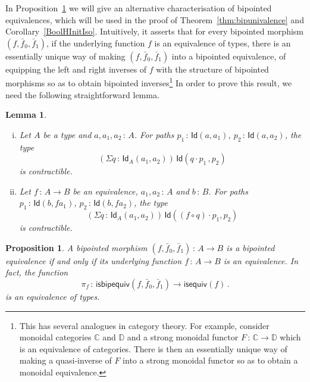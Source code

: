 \documentclass[10pt,a4paper,oneside,reqno]{amsart}
\numberwithin{equation}{section}
\theoremstyle{mythm}
\newtheorem{lemma}[theorem]{Lemma}
\newtheorem{proposition}[theorem]{Proposition}
\theoremstyle{mydef}
\theoremstyle{myrmk}
\newcommand{\ie}{\text{i.e.\ }}
\newcommand{\co}{\,{:}\,}
\newcommand{\ct}{\cdot}
\newcommand{\isequiv}{\mathsf{isequiv}}
\newcommand{\Id}{\mathsf{Id}}
\newcommand{\isbipequiv}{\mathsf{isbipequiv}}
\begin{document}
In Proposition~\ref{thm:usemere} we will give an alternative characterisation of bipointed 
equivalences, which will be used in the proof of Theorem~\ref{thm:bipunivalence} and Corollary~\ref{BoolHInitIso}.
Intuitively, it asserts that for every bipointed morphism $(f, \bar{f}_0, \bar{f}_1)$, 
 if the underlying function $f$  is an equivalence of types, there is an 
essentially unique way of making $(f, \bar{f}_0, \bar{f}_1)$ into a bipointed equivalence, \ie of equipping the left and right inverses of $f$ with the structure of bipointed morphisms so as to obtain bipointed inverses\footnote{This has several analogues in category theory. For example, consider monoidal categories $\mathbb{C}$ and $\mathbb{D}$
and a strong monoidal functor $F \co \mathbb{C} \to \mathbb{D}$ which is an equivalence of categories. There is then an
essentially unique way of making a quasi-inverse of $F$ into a strong monoidal functor so as to obtain a
monoidal equivalence.}  In order to prove this result,
we need the following straightforward lemma.



\begin{lemma} \hfill \label{thm:useful}
\begin{enumerate}[(i)]
\item Let $A$ be a type and $a, a_1, a_2 \co A$. For paths $p_1 \co \Id(a,a_1)$, $p_2 \co \Id(a,a_2)$, the type 
\[
(\Sigma q \co \Id_A(a_1,a_2)) \, \Id( q \ct p_1 \, , p_2)
\] 
is contractible. 
\item Let $f \co A \to B$ be an equivalence, $a_1, a_2 \co A$ and $b \co B$. For paths $p_1 \co \Id(b, f a_1)$, 
$p_2 \co \Id(b, fa_2)$, the type 
\[
(\Sigma q \co \Id_A(a_1,a_2)) \, \Id( (f \circ q) \ct p_1 , p_2)
\] 
is contractible.
\end{enumerate}
\end{lemma}




\begin{proposition}  \label{thm:usemere}  A bipointed morphism $(f, \bar{f}_0, \bar{f}_1) \co A \to B$ is a bipointed equivalence if and only
if its underlying function $f \co A \to B$ is an equivalence. In fact,  the  function
\[
\pi_f \co \isbipequiv(f, \bar{f}_0, \bar{f}_1)  \to \isequiv(f) \, .
\]
is an equivalence of types. 
\end{proposition}  
\end{document}
